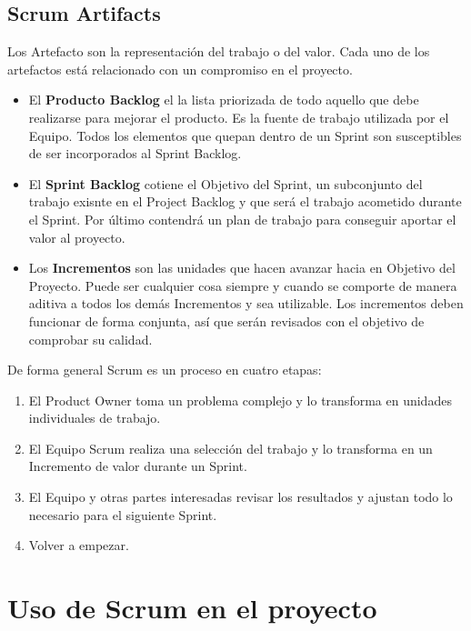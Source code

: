 \subsection{Scrum Artifacts}

Los Artefacto son la representación del trabajo o del valor. Cada uno de los artefactos está relacionado con un compromiso en el proyecto.

\begin{itemize}
    \item El \textbf{Producto Backlog} el la lista priorizada de todo aquello que debe realizarse para mejorar el producto. Es la fuente de trabajo utilizada por el Equipo. Todos los elementos que quepan dentro de un Sprint son susceptibles de ser incorporados al Sprint Backlog.
    \item El \textbf{Sprint Backlog} cotiene el Objetivo del Sprint, un subconjunto del trabajo exisnte en el Project Backlog y que será el trabajo acometido durante el Sprint. Por último contendrá un plan de trabajo para conseguir aportar el valor al proyecto.
    \item Los \textbf{Incrementos} son las unidades que hacen avanzar hacia en Objetivo del Proyecto. Puede ser cualquier cosa siempre y cuando se comporte de manera aditiva a todos los demás Incrementos y sea utilizable. Los incrementos deben funcionar de forma conjunta, así que serán revisados con el objetivo de comprobar su calidad.
\end{itemize}

De forma general Scrum es un proceso en cuatro etapas:

\begin{enumerate}
    \item El Product Owner toma un problema complejo y lo transforma en unidades individuales de trabajo.
    \item El Equipo Scrum realiza una selección del trabajo y lo transforma en un Incremento de valor durante un Sprint.
    \item El Equipo y otras partes interesadas revisar los resultados y ajustan todo lo necesario para el siguiente Sprint.
    \item Volver a empezar.
\end{enumerate}

\section{Uso de Scrum en el proyecto}
\label{sec:uso-scrum-en-el-proyecto}


